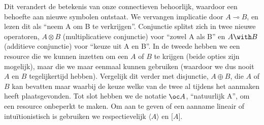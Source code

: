 Dit verandert de betekenis van onze connectieven behoorlijk, waardoor een behoefte aan nieuwe symbolen ontstaat. We vervangen implicatie door $A \multimap B$, en lezen dit als \enquote{neem A om B te verkrijgen}. Conjunctie splitst zich in twee nieuwe operatoren, $A \otimes B$ (multiplicatieve conjunctie) voor \enquote{zowel A als B} en $A \with B$ (additieve conjunctie) voor \enquote{keuze uit A en B}. In de tweede hebben we een resource die we kunnen inzetten om een $A$ of $B$ te krijgen (beide opties zijn mogelijk), maar die we maar eenmaal kunnen gebruiken (waardoor we dus nooit $A$ en $B$ tegelijkertijd hebben). Vergelijk dit verder met disjunctie, $A \oplus B$, die $A$ of $B$ kan bevatten maar waarbij de keuze welke van de twee al tijdens het aanmaken heeft plaatsgevonden. Tot slot hebben we de notatie $\oc A$, \enquote{natuurlijk A}, om een resource onbeperkt te maken. Om aan te geven of een aanname lineair of intu\"itionistisch is gebruiken we respectievelijk $\langle A \rangle$ en $\lbrack A \rbrack$.

